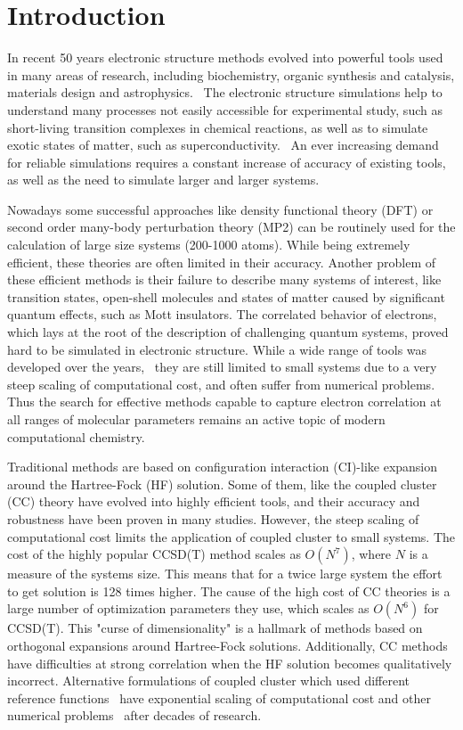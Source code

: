 \chapter{Introduction
\label{ch:introduction}}
In recent 50 years electronic structure methods evolved into powerful tools 
used in many areas of research, including biochemistry, organic 
synthesis and catalysis, materials design and astrophysics.~\cite{} The 
electronic structure simulations help to understand many processes not easily 
accessible for experimental study, such as short-living transition complexes in 
chemical reactions, as well as to simulate exotic states of matter, such as 
superconductivity.~\cite{} An ever increasing demand for reliable 
simulations requires a constant increase of accuracy of existing tools, as 
well as the need to simulate larger and larger systems. 

Nowadays some successful approaches like density functional theory 
(DFT) or second order many-body perturbation theory (MP2) can be routinely used 
for the calculation of large size systems (200-1000 atoms). While being 
extremely efficient, these theories are often limited in their accuracy. 
Another problem of these efficient methods is their failure to 
describe many systems of interest, like transition states, open-shell molecules 
and states of matter caused by significant quantum effects, such as Mott 
insulators. The correlated behavior of electrons, which lays at the root of the 
description of challenging quantum systems, proved hard to be simulated in 
electronic structure. While a wide range of tools was developed over the 
years,~\cite{} they are still limited to small systems due to a very steep 
scaling of computational cost, and often suffer from numerical problems. Thus 
the search for effective methods capable to capture electron correlation at all 
ranges of molecular parameters remains an active topic of modern 
computational chemistry.

Traditional methods are based on configuration interaction (CI)-like expansion 
around the Hartree-Fock (HF) solution. Some of them, like the coupled cluster 
(CC) theory have evolved into highly efficient tools,\cite{benedict_intro} and 
their accuracy and robustness have been proven in many 
studies.\cite{benedict_intro} However, the steep scaling of computational cost 
limits the application of coupled cluster to small systems. The cost of the 
highly popular CCSD(T) method scales as $O(N^7)$, where $N$ is a measure of the 
systems size. This means that for a twice large system the effort to get 
solution is 128 times higher. The cause of the high cost of CC theories is a 
large number of optimization parameters they use, which scales as $O(N^6)$ for 
CCSD(T). This "curse of dimensionality" is a hallmark of methods based on 
orthogonal expansions around Hartree-Fock solutions.
Additionally, CC methods have difficulties at strong correlation when the HF 
solution becomes qualitatively incorrect. Alternative formulations of coupled 
cluster which used different reference functions~\cite{} have exponential 
scaling of computational cost and other numerical problems~\cite{} after decades 
of research.

